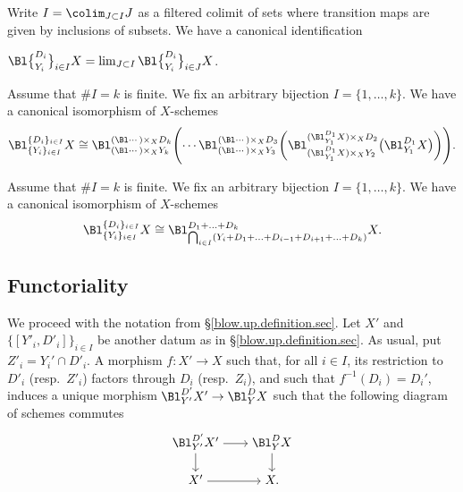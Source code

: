 \documentclass[10pt]{alggeom}
\theoremstyle{definition}
\numberwithin{equation}{section}
\begin{document}
\prop[{\cite{ Ma23d}}] \label{colimitspacegeneral} Write $I = \colim _{J \subset I} J $ as a filtered colimit of sets where transition maps are given by inclusions of subsets. We have a canonical identification 
\begin{center}$\Bl \big\{^{D_i}_{Y_i}  \big\}_{i \in I}  X = \lim_{J \subset I} \Bl \big\{^{D_i}_{Y_i}  \big\}_{i \in J} X $.\end{center} 
\xprop 

\prop[{\cite{ Ma23d}}] \label{multisingle} 
Assume that $\#I=k$ is finite. We fix an arbitrary bijection $I = \{ 1 ,\ldots , k\}$.  We have a canonical isomorphism of $X$-schemes
\[ \Bl _{\{Y_i\}_{i \in I}}^{\{D_i\}_{i \in I} }X  \cong \Bl ^{(\Bl\cdots ) \times _X D_k}_{( \Bl \cdots ) \times _X Y_k }\Biggl(\cdots \Bl_{(\Bl \cdots ) \times _X Y_3}^{(\Bl\cdots ) \times _X D_3}\biggl( \Bl _{(\Bl_{Y_1}^{D_1}X) \times _{X} Y_2} ^{(\Bl_{Y_1}^{D_1}X) \times _{X} D_2} \bigl(\Bl _{Y_1}^{D_1} X \bigl) \biggl) \Biggl). \]
\xprop


\prop[{\cite{ Ma23d}}] \label{formulamultimono} 
Assume that $\#I=k$ is finite. We fix an arbitrary bijection $I = \{ 1 ,\ldots , k\}$. We have a canonical isomorphism of $X$-schemes
 \[\Bl _{\{Y_i\}_{i \in I}}^{\{D_i\}_{i \in I} }X  \cong \Bl _{\bigcap _{i \in I }( Y_i + D_1+ \ldots + D_{i-1} + D_{i+1} + \ldots + D_k)} ^{D_1+ \ldots + D_k} X.\]
\xprop 






\subsection{Functoriality} \label{blow.up.base.functoriality.sec} We proceed with the notation from \S\ref{blow.up.definition.sec}.
Let $X'$ and $\{[Y'_i , D'_i]\} _{i\in I}  $ be another datum as in \S\ref{blow.up.definition.sec}. As usual, put $Z'_i= Y_i' \cap D'_i$.
A morphism $f:X'\to X$ such that, for all $i \in I$, its restriction to $D'_i$ (resp.~${Z'_i}$) factors through $D_i$ (resp.~$Z_i$), and such that $f^{-1} (D_i) = D_i'$, induces a unique morphism  $\Bl_{Y'}^{D'}X'\to \Bl_Y^DX$ such that the following diagram of schemes commutes
\[
\begin{tikzpicture}[baseline=(current  bounding  box.center)]
\matrix(a)[matrix of math nodes, 
row sep=1.5em, column sep=2em, 
text height=1.5ex, text depth=0.45ex] 
{ 
\Bl_{Y'}^{D'}X'& \Bl_Y^DX \\ 
X'& X.\\}; 
\path[->](a-1-1) edge node[above] {} (a-1-2);
\path[->](a-2-1) edge node[above] {} (a-2-2);
\path[->](a-1-1) edge node[right] {} (a-2-1);
\path[->](a-1-2) edge node[right] {} (a-2-2);
\end{tikzpicture}
\] 
\end{document}
